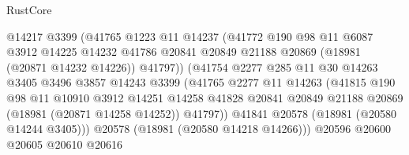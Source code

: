 \begin{lexlean}{RustCore}
\begin{coremodule}
                                @14217
                                @3399
                                (@41765
                                  @1223
                                  @11
                                  @14237
                                  (@41772
                                    @190
                                    @98
                                    @11
                                    @6087
                                    @3912
                                    @14225
                                    @14232
                                    @41786
                                    @20841
                                    @20849
                                    @21188
                                    @20869
                                    (@18981 (@20871 @14232 @14226))
                                    @41797))
                                (@41754
                                  @2277
                                  @285
                                  @11
                                  @30
                                  @14263
                                  @3405
                                  @3496
                                  @3857
                                  @14243
                                  @3399
                                  (@41765
                                    @2277
                                    @11
                                    @14263
                                    (@41815
                                      @190
                                      @98
                                      @11
                                      @10910
                                      @3912
                                      @14251
                                      @14258
                                      @41828
                                      @20841
                                      @20849
                                      @21188
                                      @20869
                                      (@18981 (@20871 @14258 @14252))
                                      @41797))
                                  @41841
                                  @20578
                                  (@18981 (@20580 @14244 @3405)))
                                @20578
                                (@18981 (@20580 @14218 @14266)))
                              @20596
                              @20600
                              @20605
                              @20610
                              @20616

\end{coremodule}
\end{lexlean}

